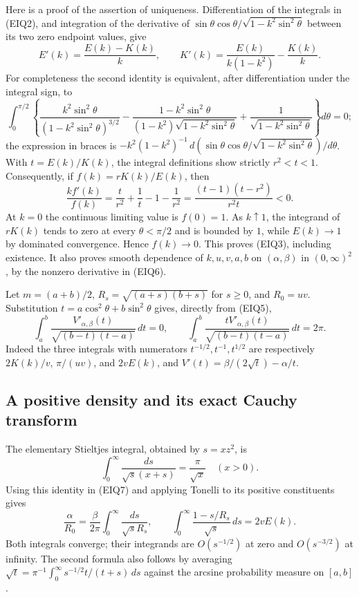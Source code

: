 \documentclass[11pt,a4paper]{article}
\begin{document}
Here is a proof of the assertion of uniqueness. Differentiation of the
integrals in (EIQ2), and integration of the derivative of
$\sin\theta\cos\theta/\sqrt{1-k^2\sin^2\theta}$ between its two zero
endpoint values, give
\[
 E'(k)=\frac{E(k)-K(k)}{k},\qquad
 K'(k)=\frac{E(k)}{k(1-k^2)}-\frac{K(k)}{k}.
\]
For completeness the second identity is equivalent, after differentiation
under the integral sign, to
\[
 \int_0^{\pi/2}
 \left\{\frac{k^2\sin^2\theta}{(1-k^2\sin^2\theta)^{3/2}}
 -\frac{1-k^2\sin^2\theta}{(1-k^2)\sqrt{1-k^2\sin^2\theta}}
 +\frac1{\sqrt{1-k^2\sin^2\theta}}\right\}d\theta=0;
\]
the expression in braces is
$-k^2(1-k^2)^{-1}\,d(\sin\theta\cos\theta/
\sqrt{1-k^2\sin^2\theta})/d\theta$.
With $t=E(k)/K(k)$, the integral definitions show strictly
$r^2<t<1$.  Consequently, if $f(k)=rK(k)/E(k)$, then
\begin{equation}\tag{EIQ6}
 \frac{kf'(k)}{f(k)}
 =\frac{t}{r^2}+\frac1t-1-\frac1{r^2}
 =\frac{(t-1)(t-r^2)}{r^2t}<0.
\end{equation}
At $k=0$ the continuous limiting value is $f(0)=1$.
As $k\uparrow1$, the integrand of $rK(k)$ tends to zero at every
$\theta<\pi/2$ and is bounded by $1$, while $E(k)\to1$ by dominated
convergence.  Hence $f(k)\to0$.  This proves (EIQ3), including existence.
It also proves smooth dependence of $k,u,v,a,b$ on $(\alpha,\beta)$ in
$(0,\infty)^2$, by the nonzero derivative in (EIQ6).

Let $m=(a+b)/2$, $R_s=\sqrt{(a+s)(b+s)}$ for $s\geq0$, and
$R_0=uv$.  Substitution
$t=a\cos^2\theta+b\sin^2\theta$ gives, directly from (EIQ5),
\begin{equation}\tag{EIQ7}
 \int_a^b\frac{V'_{\alpha,\beta}(t)}
                  {\sqrt{(b-t)(t-a)}}\,dt=0,
 \qquad
 \int_a^b\frac{tV'_{\alpha,\beta}(t)}
                  {\sqrt{(b-t)(t-a)}}\,dt=2\pi.
\end{equation}
Indeed the three integrals with numerators $t^{-1/2},t^{-1},t^{1/2}$
are respectively $2K(k)/v$, $\pi/(uv)$, and $2vE(k)$, and
$V'(t)=\beta/(2\sqrt t)-\alpha/t$.

\subsection{A positive density and its exact Cauchy transform}
The elementary Stieltjes integral, obtained by $s=xz^2$, is
\begin{equation}\tag{EIQ8}
 \int_0^\infty\frac{ds}{\sqrt s(x+s)}=\frac\pi{\sqrt x}
 \quad(x>0).
\end{equation}
Using this identity in (EIQ7) and applying Tonelli to its positive
constituents gives
\begin{equation}\tag{EIQ9}
 \frac\alpha{R_0}=
 \frac\beta{2\pi}\int_0^\infty\frac{ds}{\sqrt s R_s},
 \qquad
 \int_0^\infty\frac{1-s/R_s}{\sqrt s}\,ds=2vE(k).
\end{equation}
Both integrals converge; their integrands are $O(s^{-1/2})$ at zero
and $O(s^{-3/2})$ at infinity.  The second formula also follows by
averaging $\sqrt t=\pi^{-1}\int_0^\infty
s^{-1/2}t/(t+s)\,ds$ against the arcsine probability measure on $[a,b]$.
\end{document}
